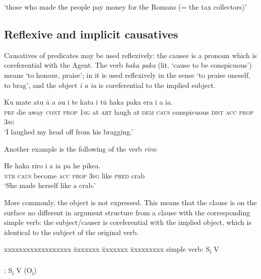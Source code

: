 \glt 
‘those who made the people pay money for the Romans (= the tax collectors)’ \textstyleExampleref{[Luke 7:34]}
\z

\subsection{Reflexive and implicit causatives} \label{sec:8.12.4}

Causatives of  predicates may be used reflexively: the causee is a pronoun which is coreferential with the Agent. The  verb \textit{haka paka} (lit. ‘cause to be conspicuous’) means ‘to honour, praise’; in  it is used reflexively in the sense ‘to praise oneself, to brag’, and the object \textit{i a ia} is coreferential to the implied subject.

\ea\label{ex:8.238}
\gll Ku mate atu {\ꞌ}ā a au {\ꞌ}i te kata {\ꞌ}i tū haka paka era  i a ia.\\
\textsc{prf} die away \textsc{cont} \textsc{prop} \textsc{1sg} at \textsc{art} laugh at \textsc{dem} \textsc{caus} conspicuous \textsc{dist}  \textsc{acc} \textsc{prop} \textsc{3sg}\\

\glt
‘I laughed my head off from his bragging.’ \textstyleExampleref{[R230.172]} 
\z

Another example is the following  of the  verb \textit{riro}:

\ea\label{ex:8.239}
\gll He haka riro i a ia pa he pīkea. \\
\textsc{ntr} \textsc{caus} become \textsc{acc} \textsc{prop} \textsc{3sg} like \textsc{pred} crab \\

\glt
‘She made herself like a crab.’ \textstyleExampleref{[R310.050]} 
\z

More commonly, the  object is not expressed. This means that the clause is on the surface no different in argument structure from a clause with the corresponding simple verb: the subject/causer is coreferential with the implied object, which is identical to the subject of the original verb.

\ea\label{ex:8.239a}
\begin{tabbing}
xxxxxxxxxxxxxxxxxx \= xxxxxxx \= xxxxxxx \= xxxxxxxxx\kill
simple verb: \> S\textsubscript{i} \> V\\
\\
 : \> S\textsubscript{i} \> V  \>  (O\textsubscript{i})
\end{tabbing}
\z
{}

